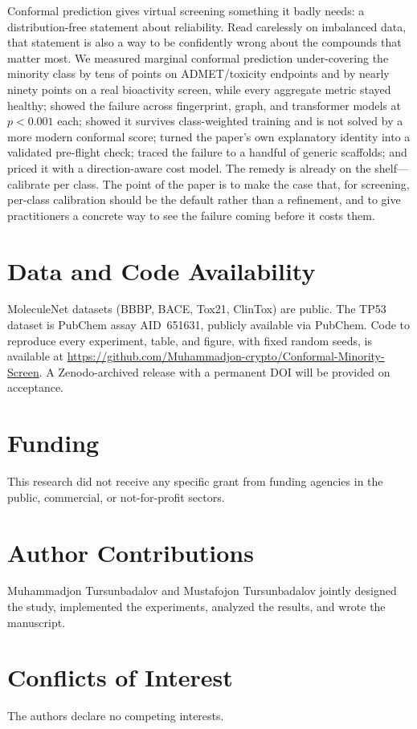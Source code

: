 \documentclass[11pt]{article}
\begin{document}
Conformal prediction gives virtual screening something it badly needs: a distribution-free
statement about reliability. Read carelessly on imbalanced data, that statement is also a way to be
confidently wrong about the compounds that matter most. We measured marginal conformal prediction
under-covering the minority class by tens of points on ADMET/toxicity endpoints and by nearly
ninety points on a real bioactivity screen, while every aggregate metric stayed healthy; showed the
failure across fingerprint, graph, and transformer models at $p<0.001$ each; showed it survives
class-weighted training and is not solved by a more modern conformal score; turned the paper's own
explanatory identity into a validated pre-flight check; traced the failure to a handful of generic
scaffolds; and priced it with a direction-aware cost model. The remedy is already on the
shelf---calibrate per class. The point of the paper is to make the case that, for screening,
per-class calibration should be the default rather than a refinement, and to give practitioners a
concrete way to see the failure coming before it costs them.

\section*{Data and Code Availability}
MoleculeNet datasets (BBBP, BACE, Tox21, ClinTox) \cite{wu2018} are public. The TP53 dataset is
PubChem assay AID~651631, publicly available via PubChem. Code to reproduce every experiment,
table, and figure, with fixed random seeds, is available at
\url{https://github.com/Muhammadjon-crypto/Conformal-Minority-Screen}. A Zenodo-archived release
with a permanent DOI will be provided on acceptance.

\section*{Funding}
This research did not receive any specific grant from funding agencies in the public, commercial,
or not-for-profit sectors.

\section*{Author Contributions}
Muhammadjon Tursunbadalov and Mustafojon Tursunbadalov jointly designed the study, implemented the
experiments, analyzed the results, and wrote the manuscript.

\section*{Conflicts of Interest}
The authors declare no competing interests.
\end{document}
